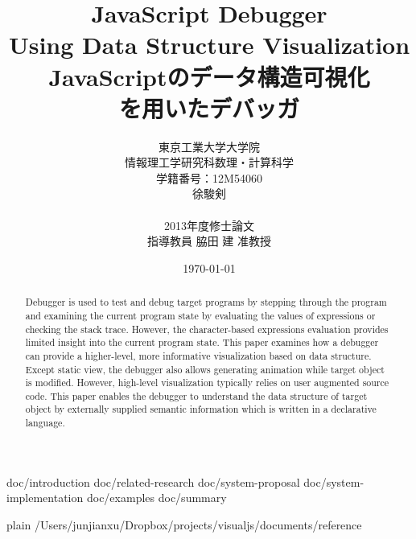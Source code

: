 \documentclass [a4paper,11pt,fleqn]{report}
\title {JavaScript Debugger\\Using Data Structure Visualization\\JavaScriptのデータ構造可視化\\を用いたデバッガ}
\author {東京工業大学大学院\\情報理工学研究科数理・計算科学\\学籍番号：12M54060\\徐駿剣\\\\2013年度修士論文\\指導教員 脇田 建 准教授}
\date {\today}
\begin{document}
\maketitle

\begin {abstract}
Debugger is used to test and debug target programs by stepping through the program and examining the current program state by evaluating the values of expressions or checking the stack trace. However, the character-based expressions evaluation provides limited insight into the current program state. This paper examines how a debugger can provide a higher-level, more informative visualization based on data structure. Except static view, the debugger also allows generating animation while target object is modified. However, high-level visualization typically relies on user augmented source code. This paper enables the debugger to understand the data structure of target object by externally supplied semantic information which is written in a declarative language.
\end {abstract}

\tableofcontents
\listoffigures
\listoftables

 {doc/introduction}
 {doc/related-research}
 {doc/system-proposal}
 {doc/system-implementation}
 {doc/examples}
 {doc/summary}

 {plain}
 {/Users/junjianxu/Dropbox/projects/visualjs/documents/reference}
\end{document}
